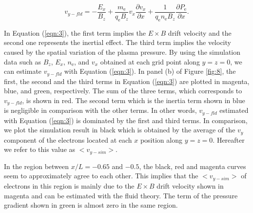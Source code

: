 \documentclass[draft,jgrga]{agutex2015}
\begin{document}
\begin{article}
\begin{linenomath}
 \begin{equation}
  v_{y-fld} = 
   - \frac{E_x}{B_z} 
   + \frac {m_\mathrm{e}}{q_\mathrm{e} B_z}v_x\frac{\partial v_x}{\partial x}
   + \frac{1}{q_\mathrm{e} n_\mathrm{e} B_z}\frac{\partial P_{\mathrm{e}}}{\partial x}.
 \label{eqn:3}
 \end{equation}
\end{linenomath}

In Equation (\ref{eqn:3}), 
the first term implies the $E \times B$ drift velocity and 
the second one represents the inertial effect. 
The third term implies the velocity caused 
by the spatial variation of the plasma pressure. 
By using the simulation data such as $B_z$, $E_x$, $n_\mathrm{e}$, 
and $v_x$ obtained at each grid point along $y=z=0$, 
we can estimate $v_{y-fld}$ with Equation (\ref{eqn:3}). 
In panel (b) of Figure \ref{fig:8}, 
the first, the second and the third terms in Equation (\ref{eqn:3}) are plotted 
in magenta, blue, and green, respectively.  
The sum of the three terms, which corresponds to $v_{y-fld}$,
is shown in red. 
The second term which is the inertia term shown in blue is negligible 
in comparison with the other terms. 
In other words, $v_{y-fld}$ estimated with Equation (\ref{eqn:3}) is 
dominated by the first and third terms. 
In comparison, 
we plot the simulation result in black which is obtained 
by the average of the $v_y$ component of the electrons
located at each $x$ position along $y=z=0$.
Hereafter we refer to this value as $<v_{y-sim}>$. 

In the region between $x/L=-0.65$ and $-0.5$, 
the black, red and magenta curves seem to approximately agree to each other. 
This implies that the $<v_{y-sim}>$ of electrons in this region 
is mainly due to the $E \times B$ drift velocity shown in magenta
and can be estimated with the fluid theory. 
The term of the pressure gradient shown in green is almost zero 
in the same region.  


\end{article}
\end{document}
